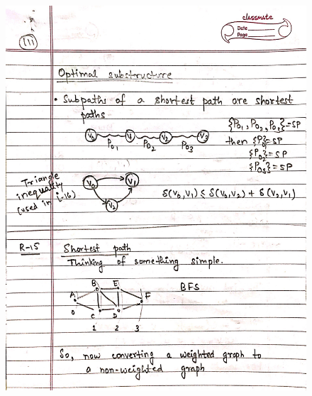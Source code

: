 \begin{figure}[H]
    \centering
    \includegraphics[width=16cm, height=21cm]{"./MIT-6.006/MIT-6006-111"}
\end{figure}
\newpage
